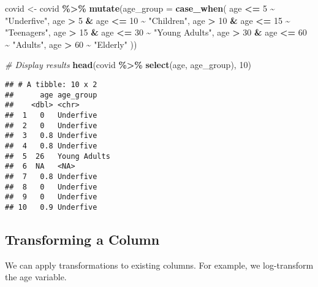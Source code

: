 \documentclass[
]{book}
\newenvironment{Shaded}{\begin{snugshade}}{\end{snugshade}}
\newcommand{\AttributeTok}[1]{\textcolor[rgb]{0.13,0.29,0.53}{#1}}
\newcommand{\CommentTok}[1]{\textcolor[rgb]{0.56,0.35,0.01}{\textit{#1}}}
\newcommand{\DecValTok}[1]{\textcolor[rgb]{0.00,0.00,0.81}{#1}}
\newcommand{\FunctionTok}[1]{\textcolor[rgb]{0.13,0.29,0.53}{\textbf{#1}}}
\newcommand{\NormalTok}[1]{#1}
\newcommand{\OtherTok}[1]{\textcolor[rgb]{0.56,0.35,0.01}{#1}}
\newcommand{\SpecialCharTok}[1]{\textcolor[rgb]{0.81,0.36,0.00}{\textbf{#1}}}
\newcommand{\StringTok}[1]{\textcolor[rgb]{0.31,0.60,0.02}{#1}}
\begin{document}
\begin{Shaded}
\begin{Highlighting}[]
\NormalTok{covid }\OtherTok{\textless{}{-}}\NormalTok{ covid }\SpecialCharTok{\%\textgreater{}\%}
  \FunctionTok{mutate}\NormalTok{(}\AttributeTok{age\_group =} \FunctionTok{case\_when}\NormalTok{(}
\NormalTok{    age }\SpecialCharTok{\textless{}=} \DecValTok{5} \SpecialCharTok{\textasciitilde{}} \StringTok{"Underfive"}\NormalTok{,}
\NormalTok{    age }\SpecialCharTok{\textgreater{}} \DecValTok{5} \SpecialCharTok{\&}\NormalTok{ age }\SpecialCharTok{\textless{}=} \DecValTok{10} \SpecialCharTok{\textasciitilde{}} \StringTok{"Children"}\NormalTok{,}
\NormalTok{    age }\SpecialCharTok{\textgreater{}} \DecValTok{10} \SpecialCharTok{\&}\NormalTok{ age }\SpecialCharTok{\textless{}=} \DecValTok{15} \SpecialCharTok{\textasciitilde{}} \StringTok{"Teenagers"}\NormalTok{,}
\NormalTok{    age }\SpecialCharTok{\textgreater{}} \DecValTok{15} \SpecialCharTok{\&}\NormalTok{ age }\SpecialCharTok{\textless{}=} \DecValTok{30} \SpecialCharTok{\textasciitilde{}} \StringTok{"Young Adults"}\NormalTok{,}
\NormalTok{    age }\SpecialCharTok{\textgreater{}} \DecValTok{30} \SpecialCharTok{\&}\NormalTok{ age }\SpecialCharTok{\textless{}=} \DecValTok{60} \SpecialCharTok{\textasciitilde{}} \StringTok{"Adults"}\NormalTok{,}
\NormalTok{    age }\SpecialCharTok{\textgreater{}} \DecValTok{60} \SpecialCharTok{\textasciitilde{}} \StringTok{"Elderly"}
\NormalTok{  ))}

\CommentTok{\# Display results}
\FunctionTok{head}\NormalTok{(covid }\SpecialCharTok{\%\textgreater{}\%} \FunctionTok{select}\NormalTok{(age, age\_group), }\DecValTok{10}\NormalTok{)}
\end{Highlighting}
\end{Shaded}

\begin{verbatim}
## # A tibble: 10 x 2
##      age age_group   
##    <dbl> <chr>       
##  1   0   Underfive   
##  2   0   Underfive   
##  3   0.8 Underfive   
##  4   0.8 Underfive   
##  5  26   Young Adults
##  6  NA   <NA>        
##  7   0.8 Underfive   
##  8   0   Underfive   
##  9   0   Underfive   
## 10   0.9 Underfive
\end{verbatim}

\subsection{Transforming a Column}\label{transforming-a-column}

We can apply transformations to existing columns. For example, we log-transform the age variable.
\end{document}
